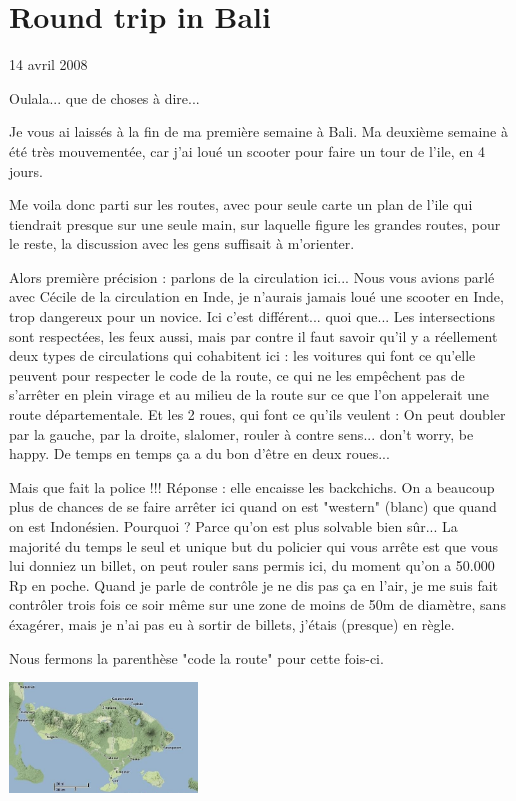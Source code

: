 \section{Round trip in Bali}

14 avril 2008

\begin{multicols}{2}

Oulala... que de choses à dire...

Je vous ai laissés à la fin de ma première semaine à Bali. Ma deuxième semaine à été très mouvementée, car j'ai loué un scooter pour faire un tour de l'ile, en 4 jours.

Me voila donc parti sur les routes, avec pour seule carte un plan de l'ile qui tiendrait presque sur une seule main, sur laquelle figure les grandes routes, pour le reste, la discussion avec les gens suffisait à m'orienter.

Alors première précision : parlons de la circulation ici... Nous vous avions parlé avec Cécile de la circulation en Inde, je n'aurais jamais loué une scooter en Inde, trop dangereux pour un novice. Ici c'est différent... quoi que... Les intersections sont respectées, les feux aussi, mais par contre il faut savoir qu'il y a réellement deux types de circulations qui cohabitent ici : les voitures qui font ce qu'elle peuvent pour respecter le code de la route, ce qui ne les empêchent pas de s'arrêter en plein virage et au milieu de la route sur ce que l'on appelerait une route départementale. Et les 2 roues, qui font ce qu'ils veulent : On peut doubler par la gauche, par la droite, slalomer, rouler à contre sens... don't worry, be happy. De temps en temps ça a du bon d'être en deux roues...

Mais que fait la police !!! Réponse : elle encaisse les backchichs. On a beaucoup plus de chances de se faire arrêter ici quand on est "western" (blanc) que quand on est Indonésien. Pourquoi ? Parce qu'on est plus solvable bien sûr... La majorité du temps le seul et unique but du policier qui vous arrête est que vous lui donniez un billet, on peut rouler sans permis ici, du moment qu'on a 50.000 Rp en poche. Quand je parle de contrôle je ne dis pas ça en l'air, je me suis fait contrôler trois fois ce soir même sur une zone de moins de 50m de diamètre, sans éxagérer, mais je n'ai pas eu à sortir de billets, j'étais (presque) en règle.

Nous fermons la parenthèse "code la route" pour cette fois-ci.

\smallbreak
\hspace*{-0.65cm}
\includegraphics[width=5cm]{articles/Round-trip-in-bali/1208257310r6gK.jpg}
\smallbreak


\end{multicols}
